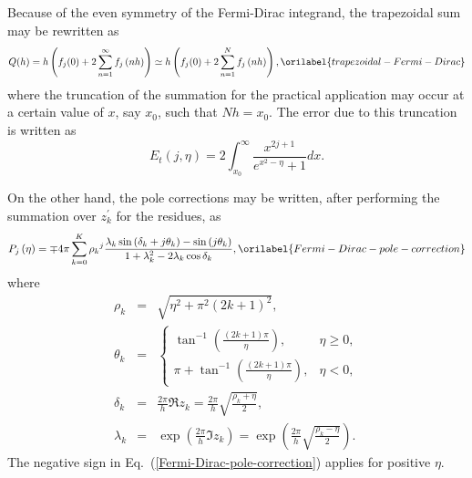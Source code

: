 \documentclass[aps,showkeys,noshowpacs,superscriptaddress,pre,preprint]{revtex4-2}
\let\label\orilabel
\begin{document}
Because of the even symmetry of the Fermi-Dirac integrand,
the trapezoidal sum may be rewritten as
\begin{equation}
{Q (h) } = h \left( {f_j (0)} + 2 \sum_{n = 1}^{\infty} {f_j \left( nh \right)} \right)
\simeq h \left( {f_j (0)} + 2 \sum_{n = 1}^{N} {f_j  \left( nh \right)} \right) ,
\label{trapezoidal-Fermi-Dirac}
\end{equation}
where the truncation of the summation for the practical application may occur 
at a certain value of $x$, say $x_0$, such that $Nh = x_0$.
The error due to this truncation is written as
\begin{equation*}
E_t \left( j, \eta \right) 
= 2 \int_{x_0}^{\infty} \frac{x^{2j+1}}{e^{x^2 - \eta} + 1} dx .
\end{equation*}

On the other hand, the pole corrections may be written, 
after performing the summation over $z_k^\prime$ for the residues, as
\begin{equation}
P_j \left( \eta \right) = \mp 4 \pi
\sum_{k = 0}^{K} {\rho_k}^j \frac{\lambda_k \sin\left( \delta_k + j \theta_k \right) -
\sin \left( j \theta_k \right)}{
1+ \lambda_k^2 - 2 \lambda_k \cos \delta_k} , 
\label{Fermi-Dirac-pole-correction}
\end{equation}
where
\begin{eqnarray*}
\rho_k &=& \sqrt{\eta^2 + \pi^2 \left( 2k + 1 \right)^2 } ,
\\
\theta_k &=& \begin{cases}
\tan^{-1} \left( \frac{\left( 2k + 1 \right) \pi}{\eta} \right) , & \eta \ge 0 , \\
\pi + \tan^{-1} \left( \frac{\left( 2k + 1 \right) \pi}{\eta} \right) , & \eta < 0 ,
\end{cases} 
\\
\delta_k &=& \frac{2\pi}{h} \Re z_k  = \frac{2\pi}{h} \sqrt{ \frac{\rho_k + \eta}{2} } , 
\\
\lambda_k &=& \exp \left( \frac{2 \pi}{h} \Im z_k  \right)
= \exp \left( \frac{2 \pi}{h} \sqrt{\frac{\rho_k - \eta}{2}} \right) .
\end{eqnarray*}
The negative sign in Eq.~(\ref{Fermi-Dirac-pole-correction}) applies for positive $\eta$.
\end{document}
